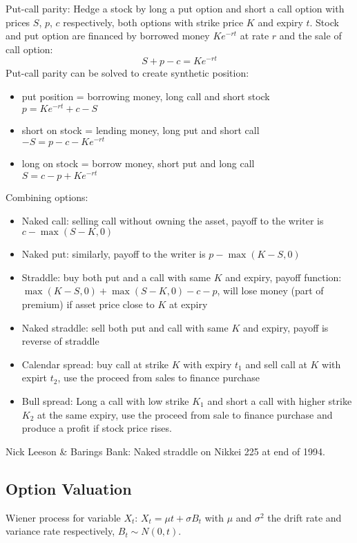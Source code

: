 \documentclass[9pt,twocolumn]{extarticle}
\begin{document}
Put-call parity: Hedge a stock by long a put option and short a call
option with prices $S$, $p$, $c$ respectively, both options with strike price $K$ and
expiry $t$. Stock and put option are financed by borrowed money $Ke^{-rt}$ at
rate $r$ and the sale of call option:
$$ S + p - c = Ke^{-rt} $$
Put-call parity can be solved to create synthetic position:
\begin{itemize}
\item put position = borrowing money, long call and short stock\\
    $p=Ke^{-rt} + c - S$
\item short on stock = lending money, long put and short call\\ $-S = p - c - Ke^{-rt}$
\item long on stock = borrow money, short put and long call\\ $S = c - p + Ke^{-rt}$
\end{itemize}
Combining options:
\begin{itemize}
\item Naked call: selling call without owning the asset, payoff to the writer
      is $c-\max(S-K,0)$
\item Naked put: similarly, payoff to the writer is $p-\max(K-S,0)$
\item Straddle: buy both put and a call with same $K$ and expiry, payoff
	  function: $\max(K-S,0) + \max(S-K,0) - c - p$, will lose money (part of
	  premium) if asset price close to $K$ at expiry
\item Naked straddle: sell both put and call with same $K$ and expiry, payoff
      is reverse of straddle
\item Calendar spread: buy call at strike $K$ with expiry $t_1$ and sell call
      at $K$ with expirt $t_2$, use the proceed from sales to finance purchase
\item Bull spread: Long a call with low strike $K_1$ and short a call with
	  higher strike $K_2$ at the same expiry, use the proceed from sale to
	  finance purchase and produce a profit if stock price rises.
\end{itemize}
Nick Leeson \& Barings Bank: Naked straddle on Nikkei 225 at end of 1994.

\subsection*{Option Valuation}
Wiener process for variable $X_t$: $X_t = \mu t + \sigma B_t$ with $\mu$ and
$\sigma^2$ the drift rate and variance rate respectively, $B_t \sim N(0,t)$.
\end{document}
